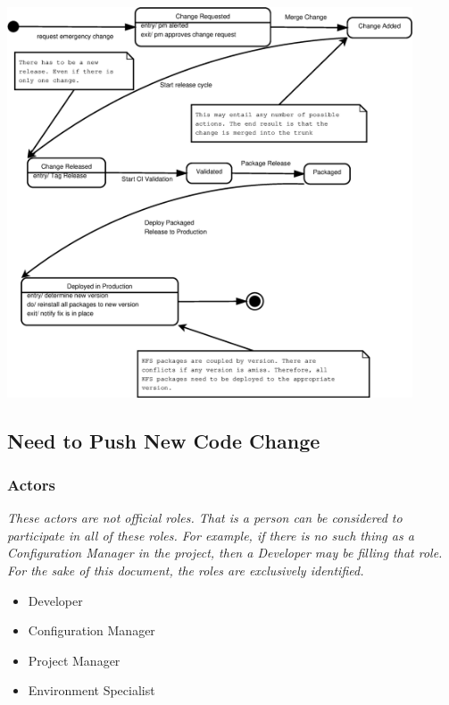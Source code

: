 \documentclass[12pt,notitlepage]{article}
\begin{document}
\includegraphics[width=12cm]{Diagrams/ChangePromotion_State3.eps}
\subsection{Need to Push New Code Change}
\subsubsection{Actors}
\emph{These actors are not official roles. That is a person can be considered to
participate in all of these roles. For example, if there is no such thing as a Configuration
Manager in the project, then a Developer may be filling that role. For the sake of
this document, the roles are exclusively identified.}
\begin{itemize}
\item Developer
\item Configuration Manager
\item Project Manager
\item Environment Specialist
\end{itemize}
\end{document}

